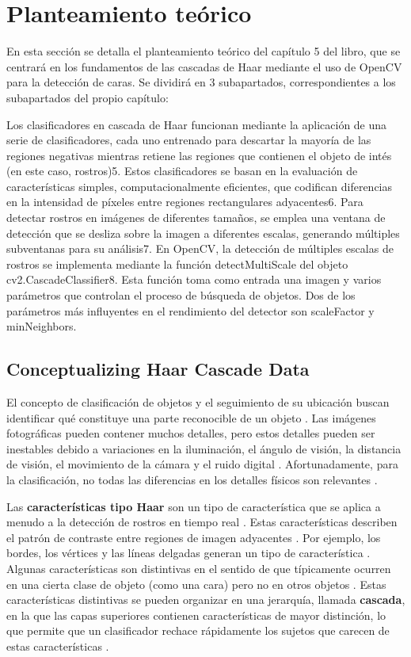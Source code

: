 \documentclass[a4paper]{article}
\begin{document}
\section{Planteamiento teórico}

En esta sección se detalla el planteamiento teórico del capítulo 5 del libro\cite{1}, que se centrará en los fundamentos de las cascadas de Haar mediante el uso de OpenCV para la detección de caras. Se dividirá en 3 subapartados, correspondientes a los subapartados del propio capítulo:

Los clasificadores en cascada de Haar funcionan mediante la aplicación de
una serie de clasificadores, cada uno entrenado para descartar la mayoría de
las regiones negativas mientras retiene las regiones que contienen el objeto de
intés (en este caso, rostros)5. Estos clasificadores se basan en la evaluación
de características simples, computacionalmente eficientes, que codifican diferencias
en la intensidad de píxeles entre regiones rectangulares adyacentes6. Para
detectar rostros en imágenes de diferentes tamaños, se emplea una ventana de
detección que se desliza sobre la imagen a diferentes escalas, generando múltiples
subventanas para su análisis7.
En OpenCV, la detección de múltiples escalas de rostros se implementa
mediante la función detectMultiScale del objeto cv2.CascadeClassifier8.
Esta función toma como entrada una imagen y varios parámetros que controlan
el proceso de búsqueda de objetos. Dos de los parámetros más influyentes en el
rendimiento del detector son scaleFactor y minNeighbors.

\subsection{Conceptualizing Haar Cascade Data}

El concepto de clasificación de objetos y el seguimiento de su ubicación buscan identificar qué constituye una parte reconocible de un objeto . Las imágenes fotográficas pueden contener muchos detalles, pero estos detalles pueden ser inestables debido a variaciones en la iluminación, el ángulo de visión, la distancia de visión, el movimiento de la cámara y el ruido digital . Afortunadamente, para la clasificación, no todas las diferencias en los detalles físicos son relevantes .

Las \textbf{características tipo Haar} son un tipo de característica que se aplica a menudo a la detección de rostros en tiempo real . Estas características describen el patrón de contraste entre regiones de imagen adyacentes . Por ejemplo, los bordes, los vértices y las líneas delgadas generan un tipo de característica . Algunas características son distintivas en el sentido de que típicamente ocurren en una cierta clase de objeto (como una cara) pero no en otros objetos . Estas características distintivas se pueden organizar en una jerarquía, llamada \textbf{cascada}, en la que las capas superiores contienen características de mayor distinción, lo que permite que un clasificador rechace rápidamente los sujetos que carecen de estas características .
\end{document}
